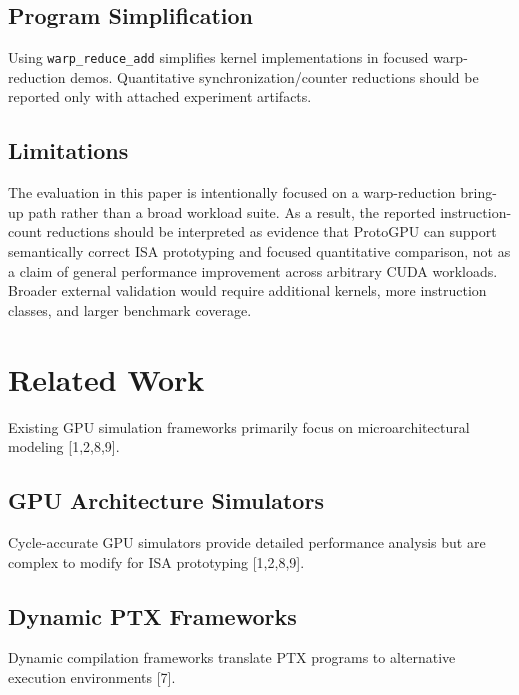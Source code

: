 \documentclass[11pt]{article}
\begin{document}
\hypertarget{program-simplification}{%
\subsection{Program Simplification}\label{program-simplification}}

Using \texttt{warp\_reduce\_add} simplifies kernel implementations in
focused warp-reduction demos. Quantitative synchronization/counter
reductions should be reported only with attached experiment artifacts.


\hypertarget{limitations}{%
\subsection{Limitations}\label{limitations}}

The evaluation in this paper is intentionally focused on a
warp-reduction bring-up path rather than a broad workload suite. As a
result, the reported instruction-count reductions should be interpreted
as evidence that ProtoGPU can support semantically correct ISA
prototyping and focused quantitative comparison, not as a claim of
general performance improvement across arbitrary CUDA workloads. Broader
external validation would require additional kernels, more instruction
classes, and larger benchmark coverage.


\hypertarget{related-work}{%
\section{Related Work}\label{related-work}}

Existing GPU simulation frameworks primarily focus on microarchitectural
modeling [1,2,8,9].

\hypertarget{gpu-architecture-simulators}{%
\subsection{GPU Architecture
Simulators}\label{gpu-architecture-simulators}}

Cycle-accurate GPU simulators provide detailed performance analysis but
are complex to modify for ISA prototyping [1,2,8,9].

\hypertarget{dynamic-ptx-frameworks}{%
\subsection{Dynamic PTX Frameworks}\label{dynamic-ptx-frameworks}}

Dynamic compilation frameworks translate PTX programs to alternative
execution environments [7].
\end{document}
